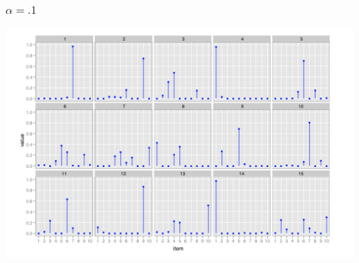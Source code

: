 \documentclass[11pt,compress,professionalfonts]{beamer}
\newcommand{\ita}{\begin{itemize}}
\newcommand{\itm}{\item[]}
\newcommand{\itz}{\end{itemize}}
\begin{document}
\begin{frame}[t]\frametitle{$\alpha=.1$}

\centerline{\includegraphics[scale=1]{pictures/dirichlet-alpha-tenth}}





%
%
%
%
%
%


\end{frame}
\end{document}
